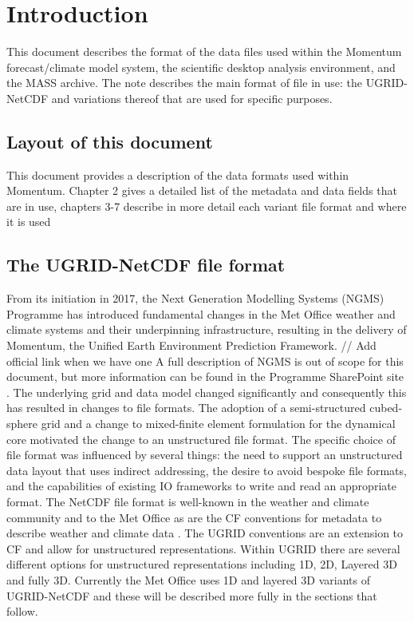 \section{Introduction}

This document describes the format of the data files used within the Momentum forecast/climate model system, the scientific desktop analysis environment, and the MASS archive. The note describes the main format of file in use: the UGRID-NetCDF and variations thereof that are used for specific purposes.

\subsection{Layout of this document}

This document provides a description of the data formats used within Momentum. Chapter 2 gives a detailed 
list of  the metadata and data fields that are in use, chapters 3-7 describe in more detail each variant file format 
and where it is used

\subsection{The UGRID-NetCDF file format}


From its initiation in 2017, the Next Generation Modelling Systems (NGMS) Programme has introduced fundamental changes in the Met Office weather and climate systems and their underpinning infrastructure, resulting in the delivery of Momentum, the Unified Earth Environment Prediction Framework.
// Add official link when we have one
A full description of NGMS is out of scope for this document, but more information can be found in the Programme SharePoint site \cite{moex}. The underlying grid and data model changed significantly and consequently this has resulted in changes to file formats. The adoption of a semi-structured cubed-sphere grid and a change to mixed-finite element formulation for the dynamical core motivated the change to an unstructured file format. The specific choice of file format was influenced by several things: the need to support an unstructured data layout that uses indirect addressing, the desire to avoid bespoke file formats, and the capabilities of existing IO frameworks to write and read an appropriate format. The NetCDF file format \cite{nc} is well-known in the weather and climate community and to the Met Office as are the CF conventions for metadata to describe weather and climate data \cite{cf}. The UGRID conventions \cite{ugrid} are an extension to CF and allow for unstructured representations. Within UGRID there are several different options for unstructured representations including 1D, 2D, Layered 3D and fully 3D. Currently the Met Office uses 1D and layered 3D variants of UGRID-NetCDF and these will be described more fully in the sections that follow.



